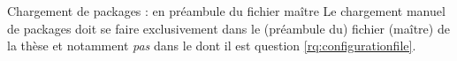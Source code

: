 \begin{dbwarning}{Chargement de packages : en préambule du fichier maître}{}
  Le chargement manuel de packages doit se faire exclusivement dans le
  (préambule du) fichier (maître) de la thèse et notamment \emph{pas} dans le
  \File{\configurationfile} dont il est question
  \vref{rq:configurationfile}.
\end{dbwarning}

%
\iffalse
\fi

